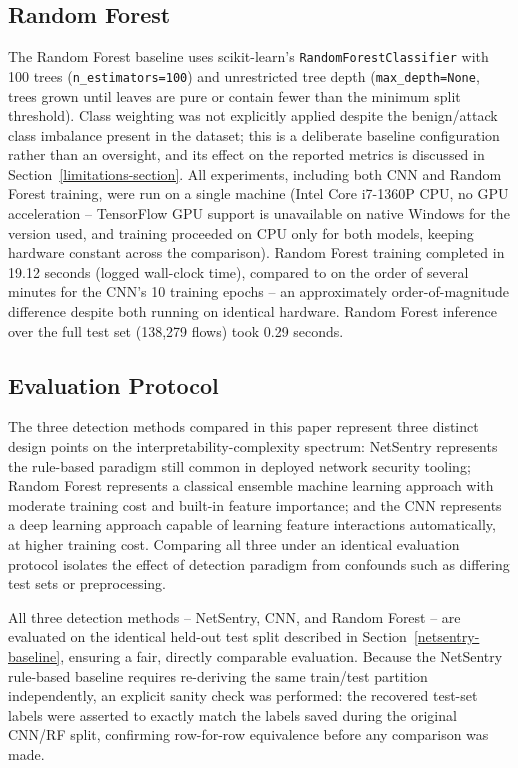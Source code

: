 \documentclass[conference]{IEEEtran}
\begin{document}
\subsection{Random Forest}
The Random Forest baseline uses scikit-learn's \texttt{RandomForestClassifier} with 100 trees (\texttt{n\_estimators=100}) and unrestricted tree depth (\texttt{max\_depth=None}, trees grown until leaves are pure or contain fewer than the minimum split threshold). Class weighting was not explicitly applied despite the benign/attack class imbalance present in the dataset; this is a deliberate baseline configuration rather than an oversight, and its effect on the reported metrics is discussed in Section~\ref{limitations-section}. All experiments, including both CNN and Random Forest training, were run on a single machine (Intel Core i7-1360P CPU, no GPU acceleration -- TensorFlow GPU support is unavailable on native Windows for the version used, and training proceeded on CPU only for both models, keeping hardware constant across the comparison). Random Forest training completed in 19.12 seconds (logged wall-clock time), compared to on the order of several minutes for the CNN's 10 training epochs -- an approximately order-of-magnitude difference despite both running on identical hardware. Random Forest inference over the full test set (138,279 flows) took 0.29 seconds.
 
\subsection{Evaluation Protocol}
\label{eval-protocol}
The three detection methods compared in this paper represent three distinct design points on the interpretability-complexity spectrum: NetSentry represents the rule-based paradigm still common in deployed network security tooling; Random Forest represents a classical ensemble machine learning approach with moderate training cost and built-in feature importance; and the CNN represents a deep learning approach capable of learning feature interactions automatically, at higher training cost. Comparing all three under an identical evaluation protocol isolates the effect of detection paradigm from confounds such as differing test sets or preprocessing.
 
All three detection methods -- NetSentry, CNN, and Random Forest -- are evaluated on the identical held-out test split described in Section~\ref{netsentry-baseline}, ensuring a fair, directly comparable evaluation. Because the NetSentry rule-based baseline requires re-deriving the same train/test partition independently, an explicit sanity check was performed: the recovered test-set labels were asserted to exactly match the labels saved during the original CNN/RF split, confirming row-for-row equivalence before any comparison was made.
 
\end{document}

